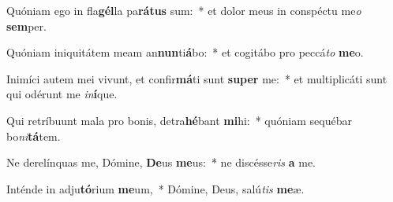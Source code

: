 \item Quóniam ego in fla\textbf{gél}la pa\textbf{rá}\textbf{tus} sum:~* et dolor meus in conspéctu me\textit{o} \textbf{sem}per.
\item Quóniam iniquitátem meam an\textbf{nun}ti\textbf{á}bo:~* et cogitábo pro peccá\textit{to} \textbf{me}o.
\item Inimíci autem mei vivunt, et confir\textbf{má}ti sunt \textbf{su}\textbf{per} me:~* et multiplicáti sunt qui odérunt me \textit{in}\textbf{í}que.
\item Qui retríbuunt mala pro bonis, detra\textbf{hé}bant \textbf{mi}hi:~* quóniam sequébar bo\textit{ni}\textbf{tá}tem.
\item Ne derelínquas me, Dómine, \textbf{De}us \textbf{me}us:~* ne discésse\textit{ris} \textbf{a} me.
\item Inténde in adju\textbf{tó}rium \textbf{me}um,~* Dómine, Deus, salú\textit{tis} \textbf{me}æ.
